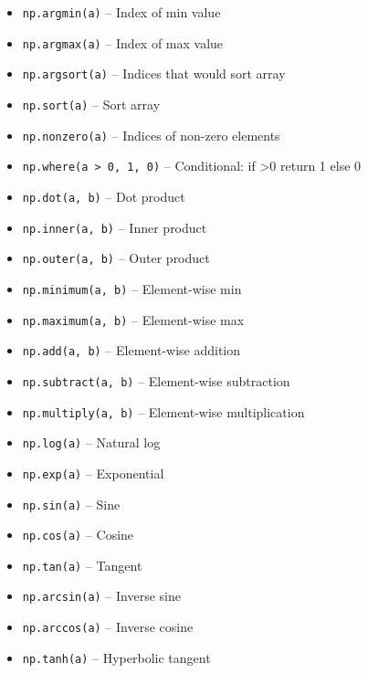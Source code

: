 \documentclass{article}
\begin{document}
\begin{itemize}
    \item \texttt{np.argmin(a)} -- Index of min value
    \item \texttt{np.argmax(a)} -- Index of max value
    \item \texttt{np.argsort(a)} -- Indices that would sort array
    \item \texttt{np.sort(a)} -- Sort array
    \item \texttt{np.nonzero(a)} -- Indices of non-zero elements
    \item \texttt{np.where(a > 0, 1, 0)} -- Conditional: if >0 return 1 else 0

    \item \texttt{np.dot(a, b)} -- Dot product
    \item \texttt{np.inner(a, b)} -- Inner product
    \item \texttt{np.outer(a, b)} -- Outer product

    \item \texttt{np.minimum(a, b)} -- Element-wise min
    \item \texttt{np.maximum(a, b)} -- Element-wise max
    \item \texttt{np.add(a, b)} -- Element-wise addition
    \item \texttt{np.subtract(a, b)} -- Element-wise subtraction
    \item \texttt{np.multiply(a, b)} -- Element-wise multiplication
    \item \texttt{np.log(a)} -- Natural log
    \item \texttt{np.exp(a)} -- Exponential
    \item \texttt{np.sin(a)} -- Sine
    \item \texttt{np.cos(a)} -- Cosine
    \item \texttt{np.tan(a)} -- Tangent
    \item \texttt{np.arcsin(a)} -- Inverse sine
    \item \texttt{np.arccos(a)} -- Inverse cosine
    \item \texttt{np.tanh(a)} -- Hyperbolic tangent
\end{itemize}
\end{document}
